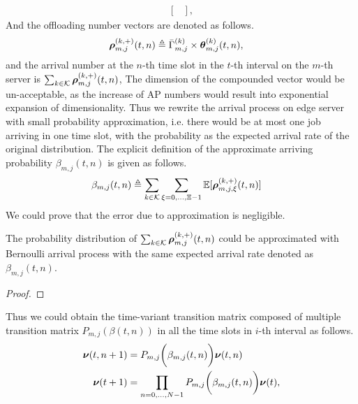 {\begin{align}
\begin{bmatrix}
        \end{bmatrix},
    \end{align}
    And the offloading number vectors are denoted as follows.
    \begin{align}
        \boldsymbol{\rho}^{(k,+)}_{m,j}({t,n}) &\triangleq \bar{\Gamma}^{(k)}_{m,j} \times \boldsymbol{\theta}^{(k)}_{m,j}({t,n}),
    \end{align}
    and the arrival number at the $n$-th time slot in the $t$-th interval on the $m$-th server is $\sum_{k\in\mathcal{K}} \boldsymbol{\rho}^{(k,+)}_{m,j}({t,n})$,
    The dimension of the compounded vector would be un-acceptable, as the increase of AP numbers would result into exponential expansion of dimensionality.
    Thus we rewrite the arrival process on edge server with small probability approximation, i.e. there would be at most one job arriving in one time slot, with the probability as the expected arrival rate of the original distribution. The explicit definition of the approximate arriving probability $\beta_{m,j}({t,n})$ is given as follows.
    \begin{align}
        {\beta}_{m,j}({t,n}) &\triangleq \sum_{k\in\mathcal{K}} \sum_{\xi=0,\dots,\Xi-1} \mathbb{E}[\boldsymbol{\rho}^{(k,+)}_{m,j,\xi}({t,n})]
        \label{eqn_0}
    \end{align}
    We could prove that the error due to approximation is negligible.
    \begin{lemma}
        The probability distribution of $\sum_{k\in\mathcal{K}} \boldsymbol{\rho}^{(k,+)}_{m,j}({t,n})$ could be approximated with Bernoulli arrival process with the same expected arrival rate denoted as ${\beta}_{m,j}({t,n})$.
    \end{lemma}
    \begin{proof}
    \end{proof}

    Thus we could obtain the time-variant transition matrix composed of multiple transition matrix $P_{m,j}(\beta({t,n}))$ in all the time slots in $i$-th interval as follows.
    \begin{align}
        \boldsymbol{\nu}({t,n+1}) &= P_{m,j}\bigg(\beta_{m,j}({t,n})\bigg) \boldsymbol{\nu}({t,n})
        \\
        \boldsymbol{\nu}(t+1) &= \prod_{n=0,\dots,N-1} P_{m,j}\bigg(\beta_{m,j}({t,n})\bigg) \boldsymbol{\nu}(t),
        \label{eqn_4}
    \end{align}

}
